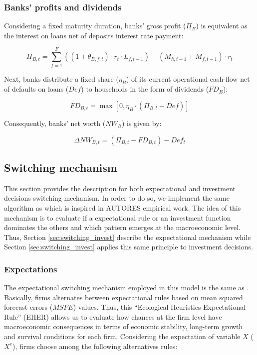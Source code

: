 \documentclass{SelfArx}
\begin{document}
\subsubsection{Banks' profits and dividends}
\label{sec:orgb6fbcfb}


Considering a fixed maturity duration, banks' gross profit (\(\Pi_{B}\)) is equivalent as the interest on loans net of deposits interest rate payment:

\begin{latex}
\begin{equation}
\Pi_{B,t} = \sum_{f=1}^{F} \left(\left(1+\theta_{B,f,t}\right)\cdot r_{t}\cdot L_{f,t-1}\right) - (M_{h,t-1} + M_{f,t-1})\cdot r_{t}
\end{equation}
\end{latex}
Next, banks distribute a fixed share (\(\eta_{B}\)) of its current operational cash-flow net of defaults on loans (\(Def\)) to households in the form of dividends (\(FD_{B}\)):

\begin{latex}
\begin{equation}
FD_{B,t} = \max [0, \eta_{B}\cdot(\Pi_{B,t} - Def)]
\end{equation}
\end{latex}
Consequently, banks' net worth (\(NW_{B}\)) is given by:
\begin{latex}
\begin{equation}
\Delta NW_{B,t} = (\Pi_{B,t} - FD_{B,t}) - Def_{t}
\end{equation}
\end{latex}

\subsection{Switching mechanism}
\label{sec:switching}
This section provides the description for both expectational and investment decisions switching mechanism.
In order to do so, we implement the same algorithm as \textcite{dosi_2020_RATIONAL,reissl_2021_Heterogeneous} which is inspired in AUTORES empirical work.
The idea of this mechanism is to evaluate if a expectational rule or an investment function dominates the others and which pattern emerges at the macroeconomic level.
Thus, Section \ref{sec:switching_invest} describe the expectational mechanism while Section \ref{sec:switching_invest} applies this same principle to investment decisions.

\subsubsection{Expectations}
\label{sec:switching_expec}
The expectational switching mechanism employed in this model is the same as \textcite{dosi_2020_RATIONAL,reissl_2021_Heterogeneous}.
Basically, firms alternates between expectational rules based on mean squared forecast errors (\(MSFE\)) values.
Thus, this ``Ecological Heuristics Expectational Rule'' (EHER) allows us to evaluate how chances at the firm level have macroeconomic consequences in terms of economic stability, long-term growth and survival conditions for each firm.
Considering the expectation of variable \(X\) (\(X^{e}\)), firms choose among the following alternatives rules:
\end{document}
